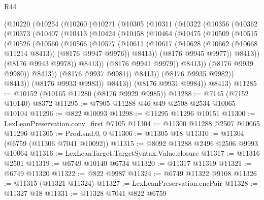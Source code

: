 \begin{lexlean}{R44}
\begin{coremodule}
{      (@10220
        (@10254
          (@10260
            (@10271
              (@10305
                (@10311
                  (@10322
                    (@10356
                      (@10362
                        (@10373
                          (@10407
                            (@10413
                              (@10424
                                (@10458
                                  (@10464
                                    (@10475
                                      (@10509
                                        (@10515
                                          (@10526
                                            (@10560
                                              (@10566
                                                (@10577
                                                  (@10611
                                                    (@10617
                                                      (@10628
                                                        (@10662 (@10668 @11214 @8413))
                                                        (@8176 @9947 @9976))
                                                      @8413))
                                                  (@8176 @9945 @9977))
                                                @8413))
                                            (@8176 @9943 @9978))
                                          @8413))
                                      (@8176 @9941 @9979))
                                    @8413))
                                (@8176 @9939 @9980))
                              @8413))
                          (@8176 @9937 @9981))
                        @8413))
                    (@8176 @9935 @9982))
                  @8413))
              (@8176 @9933 @9983))
            @8413))
        (@8176 @9931 @9984))
      @8413)
@11285 := @10152 (@10165 @11280 (@8176 @9929 @9985))
@11288 := @7145 (@7152 @10140) @8372
@11295 := @7905 @11288 @46 @49 @2508 @2534 @10065 @10104
@11296 := @822 @10093
@11298 := @11295 @11296 @10151
@11300 := LexLeanPreservation.conv_first @7105
@11304 := @11300 @11288 @2507 @10065 @11296
@11305 := Prod.snd.{0, 0}
@11306 := @11305 @18
@11310 := @11304 (@6759 (@11306 @7041 @10092))
@11315 := @8092 @11288 @2496 @2506 @9993 @10064
@11316 := LexLeanTarget.TargetSyntax.Value.closure
@11317 := @11316 @2501
@11319 := @6749 @10140 @6734
@11320 := @11317 @11319
@11321 := @6749 @11320
@11322 := @822 @9987
@11324 := @6749 @11322 @9108
@11326 := @11315 (@11321 @11324)
@11327 := LexLeanPreservation.encPair
@11328 := @11327 @18
@11331 := @11328 @7041 @822 @6759
}
\end{coremodule}
\end{lexlean}
